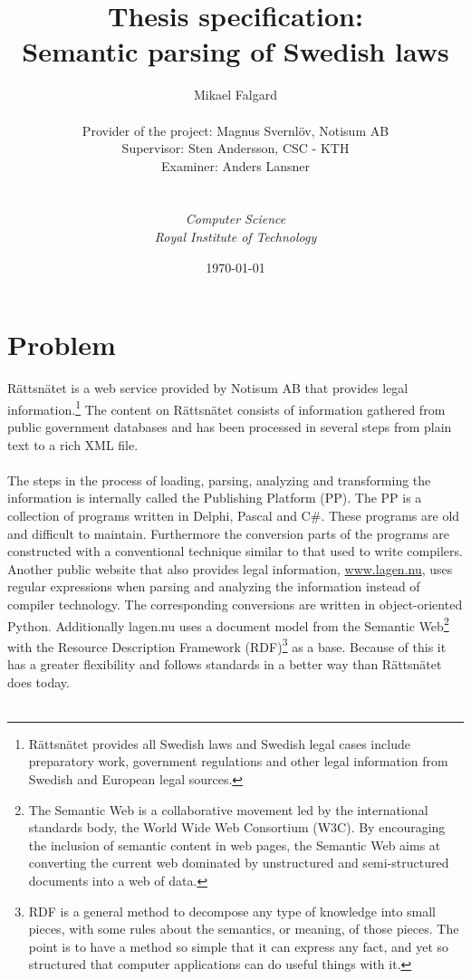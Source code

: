 \documentclass[12pt]{report}
\title{Thesis specification:\\ Semantic parsing of Swedish laws }
\author{
        Mikael Falgard\\ \\
        Provider of the project: Magnus Svernlöv, Notisum AB\\
        Supervisor: Sten Andersson, CSC - KTH\\
        Examiner: Anders Lansner \\\\\\
        \it{Computer Science}\\
        Royal Institute of Technology
        }
\date{\today}
\begin{document}
\maketitle
\section*{Problem}
Rättsnätet is a web service provided by Notisum AB that provides legal information.\footnote[1]{Rättsnätet provides all Swedish laws and Swedish legal cases include preparatory work, government regulations and other legal information from Swedish and European legal sources.} The content on Rättsnätet consists of information gathered from public government databases and has been processed in several steps from plain text to a rich XML file.\\\\
The steps in the process of loading, parsing, analyzing and transforming the information is internally called the Publishing Platform (PP). The PP is a collection of programs written in Delphi, Pascal and C\#. These programs are old and difficult to maintain. Furthermore the conversion parts of the programs are constructed with a conventional technique similar to that used to write compilers. \\
Another public website that also provides legal information, \url{www.lagen.nu}, uses regular expressions when parsing and analyzing the information instead of compiler technology. The corresponding conversions are written in object-oriented Python. Additionally lagen.nu uses a document model from the Semantic Web\footnote[2]{The Semantic Web is a collaborative movement led by the international standards body, the World Wide Web Consortium (W3C). By encouraging the inclusion of semantic content in web pages, the Semantic Web aims at converting the current web dominated by unstructured and semi-structured documents into a web of data.} with the Resource Description Framework (RDF)\footnote[3]{RDF is a general method to decompose any type of knowledge into small pieces, with some rules about the semantics, or meaning, of those pieces. The point is to have a method so simple that it can express any fact, and yet so structured that computer applications can do useful things with it.} as a base. Because of this it has a greater flexibility and follows standards in a better way than Rättsnätet does today.\\\\

\pagebreak
\end{document}
